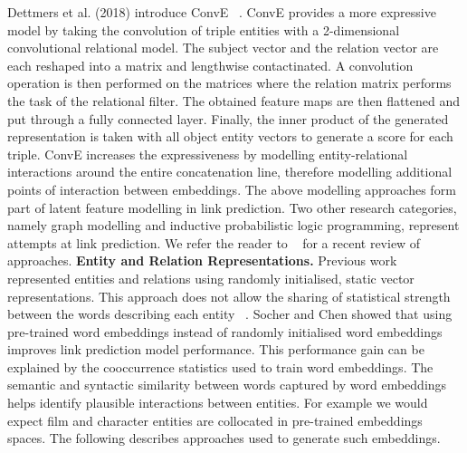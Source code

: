 Dettmers et al. (2018) introduce ConvE ~\citep{dettmers2018convolutional}. ConvE provides a more expressive model by taking the convolution of triple entities with a 2-dimensional convolutional relational model. The subject vector and the relation vector are each reshaped into a matrix and lengthwise contactinated. A convolution operation is then performed on the matrices where the relation matrix performs the task of the relational filter. The obtained feature maps are then flattened and put through a fully connected layer. Finally, the inner product of the generated representation is taken with all object entity vectors to generate a score for each triple. ConvE  increases the expressiveness by modelling entity-relational interactions  around the entire concatenation line, therefore modelling additional points of interaction between embeddings. \newline
The above modelling approaches form part of latent feature modelling in link prediction. Two other research categories, namely graph modelling and inductive probabilistic logic programming, represent attempts at link prediction. We refer the reader to ~\citep{nickel2015review} for a recent review of approaches. \newline
\textbf{Entity and Relation Representations.} Previous work represented entities and relations using randomly initialised, static vector representations. This approach does not allow the sharing of statistical strength between the words describing each entity ~\citep{socher2013reasoning}. Socher and Chen showed that using pre-trained word embeddings instead of randomly initialised word embeddings improves link prediction model performance. This performance gain can be explained by the cooccurrence statistics used to train word embeddings. The semantic and syntactic similarity between words captured by word embeddings helps identify plausible interactions between entities. For example we would expect film and character entities are collocated in pre-trained embeddings spaces. The following describes approaches used to generate such embeddings. \newline
